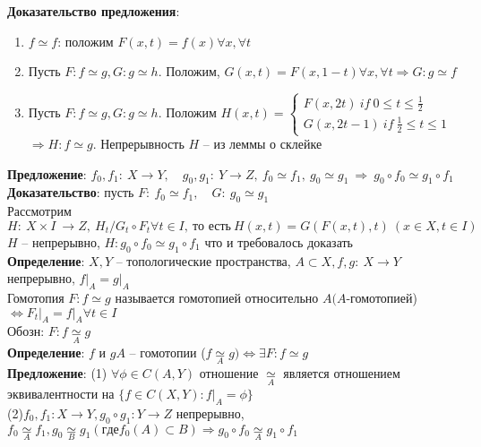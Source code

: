 	\textbf{Доказательство предложения}:\\
	\begin{enumerate}
		\item $f\simeq f$: положим $F(x,t) = f(x) \forall x, \forall t$
		\item Пусть $F: f \simeq g, G: g\simeq h$. Положим, $G(x,t) = F(x, 1-t) \forall x, \forall t \Rightarrow G: g \simeq f$
		\item Пусть $F: f\simeq g, G: g\simeq h$. Положим $H(x,t) = 
		\begin{cases}
			F(x, 2t)\ if\ 0 \leq t \leq \frac{1}{2}\\
			G(x, 2t-1)\ if\ \frac{1}{2} \leq t \leq 1
		\end{cases}$
		$\Rightarrow H: f \simeq g$. Непрерывность $H$ -- из леммы о склейке
	\end{enumerate}
	\begin{figure}[h]
	\end{figure}
	\textbf{Предложение}: $f_0, f_1:\ X \rightarrow Y,\quad g_0, g_1:\ Y \rightarrow Z,\ f_0 \simeq f_1,\ g_0 \simeq g_1\ \Rightarrow\ g_0 \circ f_0 \simeq g_1 \circ f_1$\\
	\textbf{Доказательство}: пусть $F:\ f_0 \simeq f_1,\quad G:\ g_0 \simeq g_1$\\
	Рассмотрим $H:\ X \times I\ \rightarrow Z,\ H_t\slash G_t \circ F_t \forall t\in I,\ \text{то есть}\ H(x,t) = G(F(x,t),t)\ (x\in X, t\in I)$\\
	$H$ -- непрерывно, $H: g_0 \circ f_0 \simeq g_1 \circ f_1$ что и требовалось доказать\\
	\textbf{Определение}: $X, Y$ -- топологические пространства, $A\subset X, f,g:\ X\rightarrow Y$ непрерывно, ${f|}_A = {g|}_A$\\
	Гомотопия $F: f\simeq g$ называется гомотопией относительно $A (A$-гомотопией) $\Leftrightarrow {F_t |}_A = {f|}_A \forall t\in I$\\
	Обозн: $F: f \underset{A}{\simeq} g$\\
	\textbf{Определение}: $f$ и $g A$ -- гомотопии ($f \underset{A}{\simeq} g) \Leftrightarrow \exists F: f\simeq g$\\
	\textbf{Предложение}: (1) $\forall \phi \in C(A,Y)$ отношение $\underset{A}{\simeq}$ является отношением эквивалентности на $\{ f\in C(X,Y): {f|}_A = \phi \}$\\
	(2)$f_0, f_1: X\rightarrow Y, g_0 \circ g_1: Y\rightarrow Z$ непрерывно, $f_0 \underset{A}{\simeq} f_1, g_0 \underset{B}{\simeq} g_1 (где f_0 (A) \subset B) \Rightarrow g_0 \circ f_0 \underset{A}{\simeq} g_1 \circ f_1$\\
